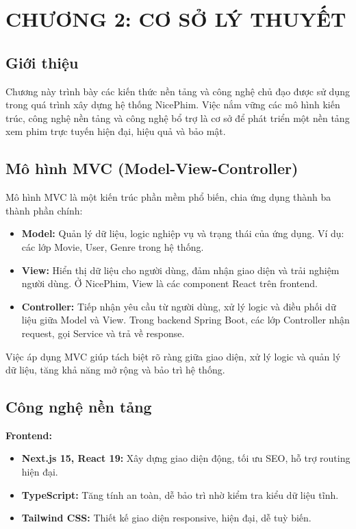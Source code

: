 \newpage

\section{CHƯƠNG 2: CƠ SỞ LÝ THUYẾT  }



\subsection{Giới thiệu}

Chương này trình bày các kiến thức nền tảng và công nghệ chủ đạo được sử dụng trong quá trình xây dựng hệ thống NicePhim. Việc nắm vững các mô hình kiến trúc, công nghệ nền tảng và công nghệ bổ trợ là cơ sở để phát triển một nền tảng xem phim trực tuyến hiện đại, hiệu quả và bảo mật.

\subsection{Mô hình MVC (Model-View-Controller)}

Mô hình MVC là một kiến trúc phần mềm phổ biến, chia ứng dụng thành ba thành phần chính:
\begin{itemize}
	\item \textbf{Model:} Quản lý dữ liệu, logic nghiệp vụ và trạng thái của ứng dụng. Ví dụ: các lớp Movie, User, Genre trong hệ thống.
	\item \textbf{View:} Hiển thị dữ liệu cho người dùng, đảm nhận giao diện và trải nghiệm người dùng. Ở NicePhim, View là các component React trên frontend.
	\item \textbf{Controller:} Tiếp nhận yêu cầu từ người dùng, xử lý logic và điều phối dữ liệu giữa Model và View. Trong backend Spring Boot, các lớp Controller nhận request, gọi Service và trả về response.
\end{itemize}

Việc áp dụng MVC giúp tách biệt rõ ràng giữa giao diện, xử lý logic và quản lý dữ liệu, tăng khả năng mở rộng và bảo trì hệ thống.

\subsection{Công nghệ nền tảng}

\textbf{Frontend:}
\begin{itemize}
	\item \textbf{Next.js 15, React 19:} Xây dựng giao diện động, tối ưu SEO, hỗ trợ routing hiện đại.
	\item \textbf{TypeScript:} Tăng tính an toàn, dễ bảo trì nhờ kiểm tra kiểu dữ liệu tĩnh.
	\item \textbf{Tailwind CSS:} Thiết kế giao diện responsive, hiện đại, dễ tuỳ biến.
\end{itemize}

